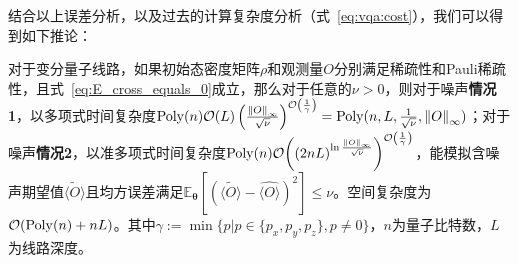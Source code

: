 结合以上误差分析，以及过去的计算复杂度分析（式~\eqref{eq:vqa:cost}），我们可以得到如下推论：

\begin{corollary}\label{corollary:noise}
    对于变分量子线路，如果初始态密度矩阵$\rho$和观测量$O$分别满足稀疏性和Pauli稀疏性，且式~\eqref{eq:E_cross_equals_0}成立，那么对于任意的$\nu > 0$，则对于噪声\textbf{情况1}，以多项式时间复杂度$\poly(n)\order{L}\left(\frac{\norm{O}_\infty}{\sqrt{\nu}}\right)^{\order{\frac{1}{\gamma}}}=\poly(n,L,\frac{1}{\sqrt{\nu}},\norm{O}_\infty)$；对于噪声\textbf{情况2}，以准多项式时间复杂度$\poly(n)\order{(2nL)^{\ln \frac{\norm{O}_\infty}{\sqrt{\nu}}}}^{\order{\frac{1}{\gamma}}}$，能模拟含噪声期望值$\widetilde{\langle O\rangle}$且均方误差满足$\mathbb{E}_{\bm{\theta}}\left[\left(\widetilde{\langle O\rangle}-\widehat{\langle O\rangle}\right)^2\right]\leq\nu$。空间复杂度为$\order{\mathrm{Poly}(n)+nL}$。其中$\gamma:=\min\{p|{p \in \{p_x,p_y,p_z\},p\neq 0}\}$，$n$为量子比特数，$L$为线路深度。
\end{corollary}

